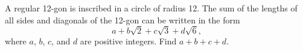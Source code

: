 A regular 12-gon is inscribed in a circle of radius 12.  The sum of the lengths of all sides and diagonals of the 12-gon can be written in the form
\[ a + b \sqrt{2} + c \sqrt{3} + d \sqrt{6}, \]
where $a$, $b$, $c$, and $d$ are positive integers.  Find $a + b + c + d$.